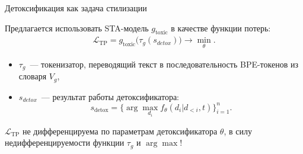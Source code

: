 \documentclass[12pt, fleqn, xcolor=x11names, xcolor=table, aspectratio=169]{beamer}
\begin{document}

\begin{frame}{Детоксификация как задача стилизации}







Предлагается использовать STA-модель 
$g_{\text{toxic}}$ в качестве функции потерь:
\begin{gather*}
    \mathcal{L}_{\text{TP}} = g_{\text{toxic}}\bigl(\tau_{g}(s_{detox}) \bigr) \to \min_\theta.
\end{gather*}

\begin{itemize}
    \item $\tau_{g}$~--- токенизатор, переводящий текст в последовательность BPE-токенов из словаря $V_g$,
    \item $s_{detox}$~--- результат работы детоксификатора:
    \[
    s_{\text{detox}} = \{\arg\max_{d_i} f_{\theta}(d_{i} | d_{<i}, t)\}_{i=1}^{n}.
    \]
    
\end{itemize}

$\mathcal{L}_{\text{TP}}$ не дифференцируема по параметрам детоксификатора $
\theta$, в силу недифференцируемости функции $\tau_g$ и $\arg \max$!


\end{frame}
\end{document}
